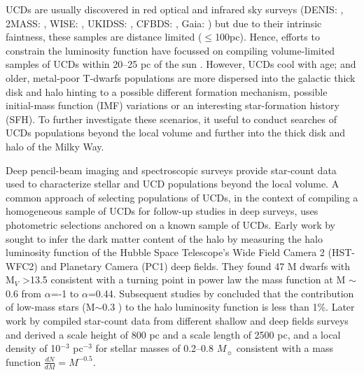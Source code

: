 \documentclass[manuscript]{aastex}
\begin{document}
UCDs are usually discovered in red optical and infrared sky surveys (DENIS: \citealt{refId0}, 2MASS: \citealt{2007AJ....133..439C, 2010ApJS..190..100K}, WISE: \citealt{2011ApJS..197...19K, 2011ApJ...743...50C}, UKIDSS: \citealt{Marocco01062015, 2013MNRAS.430.1171D,2013MNRAS.433..457B}, CFBDS: \citealt{Reyle2010a}, Gaia: \citealt{Reyle2018}) but due to their intrinsic faintness, these samples are distance limited ($\leq$100pc). Hence, efforts to constrain the luminosity function have focussed on compiling volume-limited samples of UCDs within 20--25 pc of the sun \citep{2007AJ....133..439C, 2008ApJ...676.1281M, Reyle2010a,  2019ApJS..240...19K,2019arXiv190604166B}. However, UCDs cool with age; and older, metal-poor T-dwarfs populations are more dispersed into the galactic thick disk and halo \citep{2009ApJ...697..148B, 2019MNRAS.486.1260Z} hinting to a possible different formation mechanism, possible initial-mass function (IMF) variations \citep{2010ARA&A..48..339B} or an interesting star-formation history (SFH). To further investigate these scenarios, it useful to conduct searches of UCDs populations beyond the local volume and further into the thick disk and halo of the Milky Way.

Deep pencil-beam imaging and spectroscopic surveys provide star-count data used to characterize stellar and UCD populations beyond the local volume. A common approach of selecting populations of UCDs, in the context of compiling a homogeneous sample of UCDs for follow-up studies in deep surveys, uses photometric selections anchored on a known sample of UCDs. Early work by \cite{1997ApJ...482..913G} sought to infer the dark matter content of the halo by measuring the halo luminosity function of the Hubble Space Telescope's Wide Field Camera 2 (HST-WFC2) and Planetary Camera (PC1) deep fields. They found 47 M dwarfs with M$_V$ \textgreater 13.5 consistent with a turning point in power law the mass function at M $\sim$0.6 \Msun from $\alpha$=-1 to $\alpha$=0.44. Subsequent studies by \cite{1997A&A...328....5K, 1997A&A...328...83C} concluded that the contribution of low-mass stars (M$\sim$0.3 \Msun ) to the halo luminosity function is less than 1\%. Later work by \cite{2001A&A...373..886R} compiled star-count data from different shallow and deep fields surveys and derived a scale height of 800 pc and a scale length of 2500 pc, and a local density of 10$^{-3}$ pc$^{-3}$ for stellar masses of 0.2--0.8 $M_\sun$ consistent with a mass function  $\frac{dN}{dM} =M^{-0.5}$. 
\end{document}
